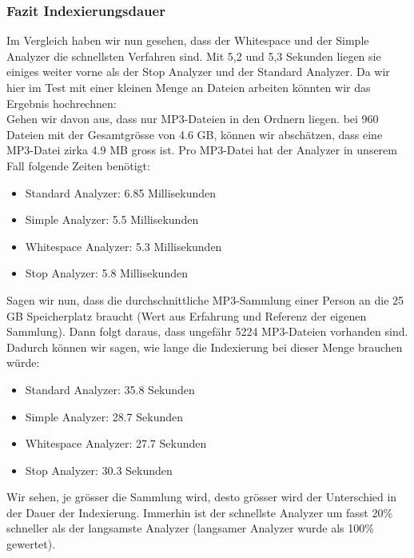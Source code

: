 \documentclass[12pt,a4paper,ngerman]{report}
\begin{document}
\subsubsection{Fazit Indexierungsdauer}
Im Vergleich haben wir nun gesehen, dass der Whitespace und der Simple Analyzer die schnellsten Verfahren sind. Mit 5,2 und 5,3 Sekunden liegen sie einiges weiter vorne als der Stop Analyzer und der Standard Analyzer. Da wir hier im Test mit einer kleinen Menge an Dateien arbeiten könnten wir das Ergebnis hochrechnen:\\
Gehen wir davon aus, dass nur MP3-Dateien in den Ordnern liegen. bei 960 Dateien mit der Gesamtgrösse von 4.6 GB, können wir abschätzen, dass eine MP3-Datei zirka 4.9 MB gross ist. Pro MP3-Datei hat der Analyzer in unserem Fall folgende Zeiten benötigt:
\begin{itemize}
	\item Standard Analyzer: 6.85 Millisekunden
	\item Simple Analyzer: 5.5 Millisekunden
	\item Whitespace Analyzer: 5.3 Millisekunden
	\item Stop Analyzer: 5.8 Millisekunden
\end{itemize}
Sagen wir nun, dass die durchschnittliche MP3-Sammlung einer Person an die 25 GB Speicherplatz braucht (Wert aus Erfahrung und Referenz der eigenen Sammlung). Dann folgt daraus, dass ungefähr 5224 MP3-Dateien vorhanden sind. Dadurch können wir sagen, wie lange die Indexierung bei dieser Menge brauchen würde:
\begin{itemize}
	\item Standard Analyzer: 35.8 Sekunden
	\item Simple Analyzer: 28.7 Sekunden
	\item Whitespace Analyzer: 27.7 Sekunden
	\item Stop Analyzer: 30.3 Sekunden
\end{itemize}
Wir sehen, je grösser die Sammlung wird, desto grösser wird der Unterschied in der Dauer der Indexierung. Immerhin ist der schnellste Analyzer um fasst 20\% schneller als der langsamste Analyzer (langsamer Analyzer wurde als 100\% gewertet).
\end{document}
